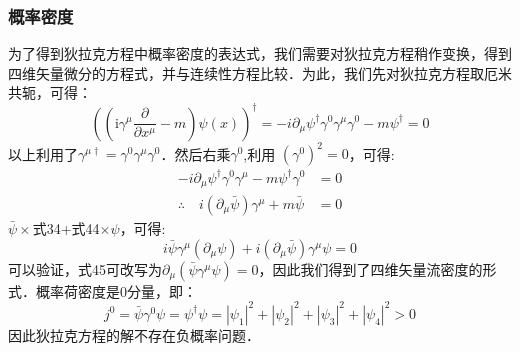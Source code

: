 \subsubsection{概率密度}
为了得到狄拉克方程中概率密度的表达式，我们需要对狄拉克方程稍作变换，得到四维矢量微分的方程式，并与连续性方程比较．为此，我们先对狄拉克方程取厄米共轭，可得：
\begin{equation}
\left(\left(\mathrm{i} \gamma^{\mu} \frac{\partial}{\partial x^{\mu}}-m\right) \psi(x)\right)^{\dagger}=-i \partial_{\mu} \psi^{\dagger} \gamma^{0} \gamma^{\mu} \gamma^{0}-m \psi^{\dagger}=0
\end{equation}
以上利用了$\gamma^{\mu \dagger}=\gamma^{0} \gamma^{\mu} \gamma^{0}$．然后右乘$\gamma ^0$,利用 $(\gamma^{0})^2=0$，可得:
\begin{equation}
\begin{aligned}
-i \partial_{\mu} \psi^{\dagger} \gamma^{0} \gamma^{\mu}-m \psi^{\dagger} \gamma^{0}&=0\\
\therefore\quad i\left(\partial_{\mu} \bar{\psi}\right) \gamma^{\mu}+m \bar{\psi}&=0
\end{aligned}
\end{equation}
$\bar\psi\times$式34+式44$\times\psi$，可得:
\begin{equation}
i \bar{\psi} \gamma^{\mu}\left(\partial_{\mu} \psi\right)+i\left(\partial_{\mu} \bar{\psi}\right) \gamma^{\mu} \psi=0
\end{equation}
可以验证，式45可改写为$\partial_{\mu}\left(\bar{\psi} \gamma^{\mu} \psi\right)=0$，因此我们得到了四维矢量流密度的形式．概率荷密度是0分量，即：\begin{equation}\label{qed4_eq24}
j^0=\bar{\psi} \gamma^{0} \psi=\psi^{\dagger}\psi=\left|\psi_{1}\right|^{2}+\left|\psi_{2}\right|^{2}+\left|\psi_{3}\right|^{2}+\left|\psi_{4}\right|^{2}>0
\end{equation}
因此狄拉克方程的解不存在负概率问题．


